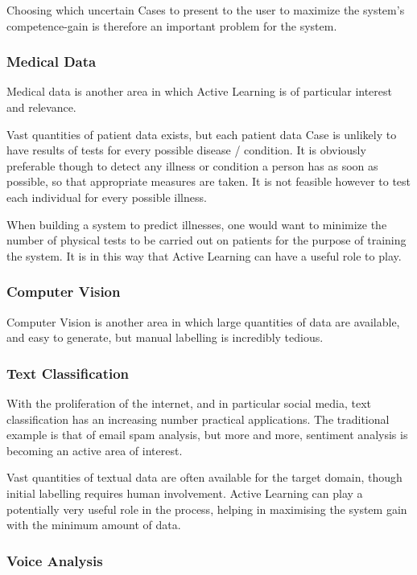 \documentclass[a4paper,11pt]{report}
\begin{document}
Choosing which uncertain Cases to present to the user to maximize the system's competence-gain is therefore an important problem for the system.

\subsubsection{Medical Data}
Medical data is another area in which Active Learning is of particular interest and relevance.

Vast quantities of patient data exists, but each patient data Case is unlikely to have results of tests for every possible disease / condition. It is obviously preferable though to detect any illness or condition a person has as soon as possible, so that appropriate measures are taken. It is not feasible however to test each individual for every possible illness.

When building a system to predict illnesses, one would want to minimize the number of physical tests to be carried out on patients for the purpose of training the system. It is in this way that Active Learning can have a useful role to play.

\subsubsection{Computer Vision}
Computer Vision is another area in which large quantities of data are available, and easy to generate, but manual labelling is incredibly tedious.

\subsubsection{Text Classification}
With the proliferation of the internet, and in particular social media, text classification has an increasing number practical applications. The traditional example is that of email spam analysis, but more and more, sentiment analysis is becoming an active area of interest.

Vast quantities of textual data are often available for the target domain, though initial labelling requires human involvement. Active Learning can play a potentially very useful role in the process, helping in maximising the system gain with the minimum amount of data.

\subsubsection{Voice Analysis}
\end{document}
